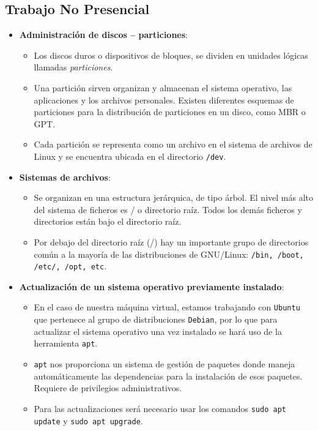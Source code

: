 \documentclass[10pt]{article}
\begin{document}
	\subsection{Trabajo No Presencial}
	\begin{itemize}
		\item \textbf{Administración de discos – particiones}: 
		\begin{itemize}
			\item Los discos duros o dispositivos de bloques, se dividen en unidades lógicas llamadas \textit{particiones}.\cite{Discos}
			\item Una partición sirven organizan y almacenan el sistema operativo, las aplicaciones y los archivos personales. Existen diferentes esquemas de particiones para la distribución de particiones en un disco, como MBR o GPT.
			\item Cada partición se representa como un archivo en el sistema de archivos de Linux y se encuentra ubicada en el directorio \verb|/dev|.
		\end{itemize}
		\item \textbf{Sistemas de archivos}: 
		\begin{itemize}
			\item Se organizan en una estructura jerárquica, de tipo árbol. El nivel más alto del sistema de ficheros es / o directorio raíz. Todos los demás ficheros y directorios están bajo el directorio raíz.\cite{Archivos}
			\item Por debajo del directorio raíz (/) hay un importante grupo de directorios común a la mayoría de las distribuciones de GNU/Linux: \verb|/bin, /boot, /etc/, /opt, etc|.
		\end{itemize}
		\item \textbf{Actualización de un sistema operativo previamente instalado}:
		\begin{itemize}
			\item En el caso de nuestra máquina virtual, estamos trabajando con \verb|Ubuntu| que pertenece al grupo de distribuciones \verb|Debian|, por lo que para actualizar el sistema operativo una vez instalado se hará uso de la herramienta \verb|apt|.
			\item \verb|apt| nos proporciona un sistema de gestión de paquetes donde maneja automáticamente las dependencias para la instalación de esos paquetes. Requiere de privilegios administrativos.\cite{Actualizar}
			\item Para las actualizaciones será necesario usar los comandos \verb|sudo apt update| y \verb|sudo apt upgrade|.

\end{itemize}
\end{itemize}
\end{document}
